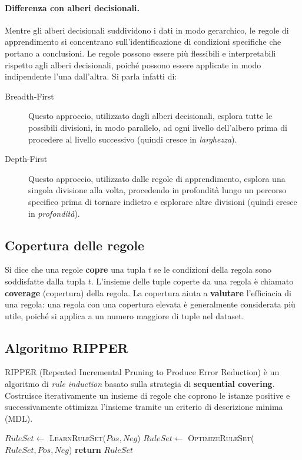 \paragraph{Differenza con alberi decisionali.}
Mentre gli alberi decisionali suddividono i dati in modo gerarchico, le regole di apprendimento si concentrano sull'identificazione di condizioni specifiche che portano a conclusioni. Le regole possono essere più flessibili e interpretabili rispetto agli alberi decisionali, poiché possono essere applicate in modo indipendente l'una dall'altra. Si parla infatti di:
\begin{description}
  \item[Breadth-First] Questo approccio, utilizzato dagli alberi decisionali, esplora tutte le possibili divisioni, in modo parallelo, ad ogni livello dell'albero prima di procedere al livello successivo (quindi cresce in \emph{larghezza}). 
  \item[Depth-First] Questo approccio, utilizzato dalle regole di apprendimento, esplora una singola divisione alla volta, procedendo in profondità lungo un percorso specifico prima di tornare indietro e esplorare altre divisioni (quindi cresce in \emph{profondità}).
\end{description}


\subsection{Copertura delle regole}
Si dice che una regole \textbf{copre} una tupla $t$ se le condizioni della regola sono soddisfatte dalla tupla $t$. L'insieme delle tuple coperte da una regola è chiamato \textbf{coverage} (copertura) della regola. La copertura aiuta a \textbf{valutare} l'efficiacia di una regola: una regola con una copertura elevata è generalmente considerata più utile, poiché si applica a un numero maggiore di tuple nel dataset.

\subsection{Algoritmo RIPPER}

RIPPER (Repeated Incremental Pruning to Produce Error Reduction) è un algoritmo di \emph{rule induction} basato sulla strategia di \textbf{sequential covering}. Costruisce iterativamente un insieme di regole che coprono le istanze positive  e successivamente ottimizza l'insieme tramite un criterio di descrizione minima (MDL).

\begin{algorithm}[H]
\caption{\textsc{RIPPER}($Pos, Neg, k$)}
\begin{algorithmic}[1]
\State $RuleSet \gets$ \textsc{LearnRuleSet}($Pos, Neg$)
    \State $RuleSet \gets$ \textsc{OptimizeRuleSet}($RuleSet, Pos, Neg$)
\EndFor
\State \textbf{return} $RuleSet$
\end{algorithmic}
\end{algorithm}

